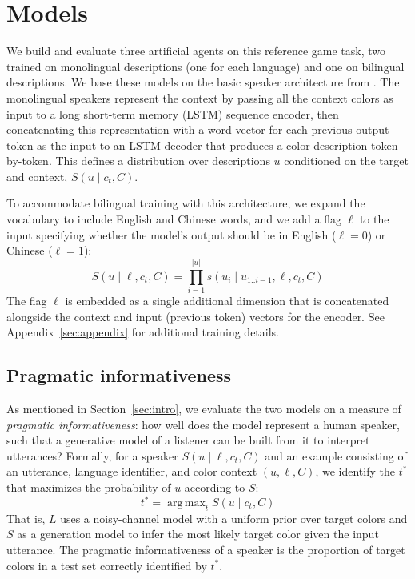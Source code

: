 \documentclass[11pt,a4paper]{article}
\renewcommand{\|}{\mid}
\DeclareMathOperator*{\argmax}{arg\,max}
\newcommand{\secref}[1]{Section~\ref{#1}}
\begin{document}
\section{Models}\label{sec:models}

We build and evaluate three artificial agents on this reference game task, two trained
on monolingual descriptions (one for each language) and one on bilingual descriptions.
We base these models on the basic speaker architecture
from \citet{Monroe2017}. The monolingual speakers 
represent the context by passing all the
context colors as input to a long short-term memory (LSTM) sequence encoder, then concatenating
this representation with a word vector for
each previous output token as the input to an LSTM decoder that produces a color description token-by-token. This defines a distribution over descriptions $u$ conditioned on the target and context, $S(u \| c_t, C)$.

To accommodate bilingual training with this architecture, we expand the
vocabulary to include English and Chinese words, and we add a flag $\ell$ to the input specifying whether the model's
output should be in English ($\ell = 0$) or Chinese ($\ell = 1$):
\[S(u \| \ell, c_t, C) = \prod_{i=1}^{|u|} s(u_i \| u_{1..i-1}, \ell, c_t, C)\]
The flag $\ell$ is embedded as a single additional dimension that is concatenated alongside the context and input (previous token)
vectors for the encoder. See Appendix~\ref{sec:appendix} for additional training details.

\subsection{Pragmatic informativeness} \label{sec:metric}

As mentioned in \secref{sec:intro}, we evaluate the two models on a measure of \emph{pragmatic informativeness}: how well does
the model represent a human speaker, such that a generative model of a listener can be built from it to interpret utterances?
Formally, for a speaker $S(u \| \ell, c_t, C)$ and an example consisting of an utterance, language identifier, and
color context $(u, \ell, C)$, we identify the $t^*$ that maximizes the probability of $u$ according to $S$:
\[t^* = \argmax_t S(u \| c_t, C)\]
That is, $L$ uses a noisy-channel model with a uniform prior over target colors and $S$ as a generation model to infer the most likely target color given the input utterance. The pragmatic informativeness of a speaker is the proportion of target colors in a test set correctly identified by $t^*$.
\end{document}
